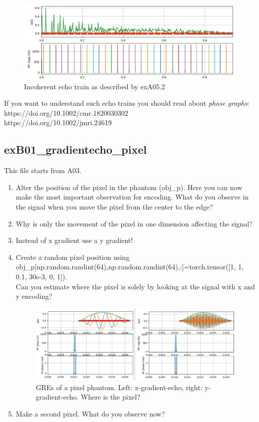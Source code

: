\documentclass[a4paper,12pt]{extarticle}
\begin{document}
\begin{figure}[H] 
\centering
\includegraphics[width=14cm]{img/exA5_incoherent_echoes.png}
\caption{Incoherent echo train as described by exA05.2} \label{fig:exA05_incoheren_echoes}
\end{figure}

If you want to understand such echo trains you should read about \emph{phase graphs}:\\
https://doi.org/10.1002/cmr.1820030302\\
https://doi.org/10.1002/jmri.24619 

\newpage
\subsection{exB01\_gradientecho\_pixel}
This file starts from A03. 
\begin{enumerate}
\item  Alter the position of the pixel in the phantom (obj\_p). Here you can now make the most important observation for encoding. What do you observe in the signal when you move the pixel from the center to the edge?
\item  Why is only the movement of the pixel in one dimension affecting the signal?
\item  Instead of x gradient use a y gradient! 
\item  Create a random pixel position using   \\ obj\_p[np.random.randint(64),np.random.randint(64),:]=torch.tensor([1, 1, 0.1, 30e-3, 0, 1]). \\Can you estimate where the pixel is solely by looking at the signal with x and y encoding?
\begin{figure}[H] 
\centering
\includegraphics[width=14cm]{img/exB01_gradient_echo_pixel.png}
\caption{GREs of a pixel phantom. Left: x-gradient-echo, right: y-gradient-echo. Where is the pixel?} \label{fig:exB01_GRE_pixel}
\end{figure}

\item  Make a second pixel. What do you observe now?
\end{enumerate}
\end{document}
